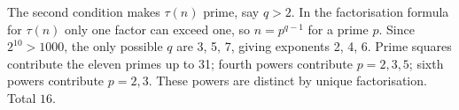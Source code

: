 The second condition makes $\tau(n)$ prime, say $ q>2 $. In the factorisation formula for $\tau(n)$ only one factor can exceed one, so $ n=p^{q-1}$ for a prime $ p $. Since $ 2^{10}>1000 $, the only possible $ q $ are 3, 5, 7, giving exponents 2, 4, 6. Prime squares contribute the eleven primes up to 31; fourth powers contribute $ p=2,3,5 $; sixth powers contribute $ p=2,3 $. These powers are distinct by unique factorisation. Total $\boxed{16}$.
